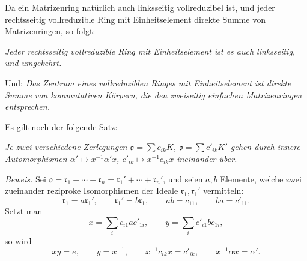 \documentclass[11pt]{article}
\providecommand{\mo}{\mathfrak{o}}
\providecommand{\mr}{\mathfrak{r}}
\begin{document}
Da ein Matrizenring natürlich auch linksseitig vollreduzibel ist, und jeder rechtsseitig vollreduzible Ring mit Einheitselement direkte Summe von Matrizenringen, so folgt:

\emph{Jeder rechtsseitig vollreduzible Ring mit Einheitselement ist es auch linksseitig, und umgekehrt.}

Und: \emph{Das Zentrum eines vollreduziblen Ringes mit Einheitselement ist direkte Summe von kommutativen Körpern, die den zweiseitig einfachen Matrizenringen entsprechen.}

Es gilt noch der folgende Satz:

\emph{Je zwei verschiedene Zerlegungen $\mo=\sum c_{ik}K$, $\mo=\sum c'_{ik}K'$ gehen durch innere Automorphismen $\alpha'\mapsto x^{-1}\alpha'x$, $c'_{ik}\mapsto x^{-1}c_{ik}x$ ineinander über.}

\emph{Beweis.} Sei $\mo=\mr_1+\cdots+\mr_n=\mr_1'+\cdots+\mr_n'$, und seien $a,b$ Elemente, welche zwei zueinander reziproke Isomorphismen der Ideale $\mr_1,\mr_1'$ vermitteln:
\[
        \mr_1=a\mr_1',
        \qquad
        \mr_1'=b\mr_1,
        \qquad
        ab=c_{11},
        \qquad
        ba=c'_{11}.
\]
Setzt man
\[
        x=\sum_i c_{i1}ac'_{1i},
        \qquad
        y=\sum_i c'_{i1}bc_{1i},
\]
so wird
\[
        xy=e,
        \qquad
        y=x^{-1},
        \qquad
        x^{-1}c_{ik}x=c'_{ik},
        \qquad
        x^{-1}\alpha x=\alpha'.
\]
\end{document}
